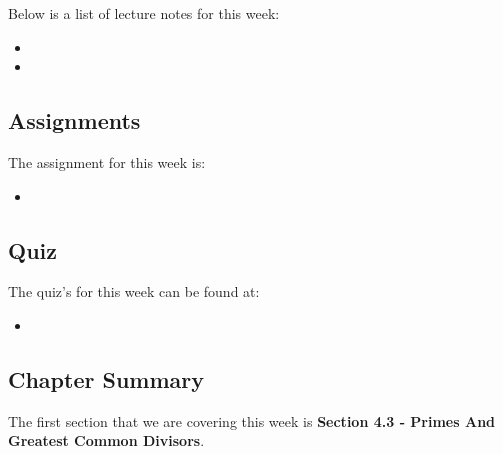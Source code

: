 \noindent Below is a list of lecture notes for this week:

\begin{itemize}
    \item {}
    \item {}
\end{itemize}

\subsection{Assignments}

The assignment for this week is:

\begin{itemize}
    \item {}
\end{itemize}

\subsection{Quiz}

The quiz's for this week can be found at:

\begin{itemize}
    \item {}
\end{itemize}

\newpage

\subsection{Chapter Summary}

The first section that we are covering this week is \textbf{Section 4.3 - Primes And Greatest Common Divisors}.


